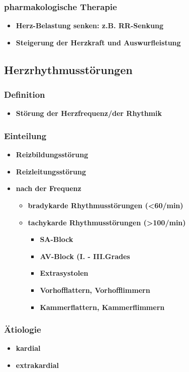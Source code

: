 		\subsubsection*{pharmakologische Therapie}
			\begin{itemize}
				\item \textbf{Herz-Belastung senken: z.B. RR-Senkung}
				\item \textbf{Steigerung der Herzkraft und Auswurfleistung}
			\end{itemize}
	\subsection*{Herzrhythmusstörungen}
		\subsubsection*{Definition}
			\begin{itemize}
				\item \textbf{Störung der Herzfrequenz/der Rhythmik}
			\end{itemize}
		\subsubsection*{Einteilung}
			\begin{itemize}
				\item \textbf{Reizbildungsstörung}
				\item \textbf{Reizleitungsstörung}
				\item \textbf{nach der Frequenz}
					\begin{itemize}
						\item \textbf{bradykarde Rhythmusstörungen (<60/min)}
						\item \textbf{tachykarde Rhythmusstörungen (>100/min)}
							\begin{itemize}
								\item \textbf{SA-Block}
								\item \textbf{AV-Block (I. - III.Grades}
								\item \textbf{Extrasystolen}
								\item \textbf{Vorhofflattern, Vorhofflimmern}
								\item \textbf{Kammerflattern, Kammerflimmern}								
							\end{itemize}
					\end{itemize}
			\end{itemize}
		\subsubsection*{Ätiologie}
			\begin{itemize}
				\item \textbf{kardial}
				\item \textbf{extrakardial}
			\end{itemize}
